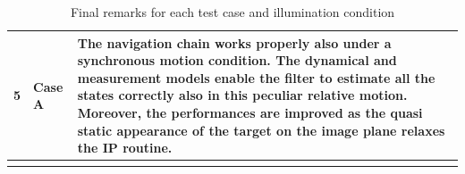 \begin{longtable}{l p{2.5cm} p{11.5cm}}
5 & Case A & The navigation chain works properly also under a synchronous motion condition. The dynamical and measurement models enable the filter to estimate all the states correctly also in this peculiar relative motion. Moreover, the performances are improved as the quasi static appearance of the target on the image plane relaxes the IP routine.  \\ \hline
\caption{Final remarks for each test case and illumination condition}
\label{tab:finalrem}
\end{longtable}

